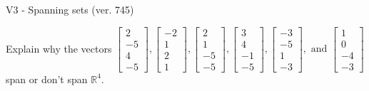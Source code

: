 \begin{exercise}
  \begin{exerciseTitle}V3 - Spanning sets (ver. 745)\end{exerciseTitle}
  \begin{exerciseStatement}
    Explain why the vectors \(\left[\begin{array}{r}
2 \\
-5 \\
4 \\
-5
\end{array}\right] , \left[\begin{array}{r}
-2 \\
1 \\
2 \\
1
\end{array}\right] , \left[\begin{array}{r}
2 \\
1 \\
-5 \\
-5
\end{array}\right] , \left[\begin{array}{r}
3 \\
4 \\
-1 \\
-5
\end{array}\right] , \left[\begin{array}{r}
-3 \\
-5 \\
1 \\
-3
\end{array}\right] , \text{ and } \left[\begin{array}{r}
1 \\
0 \\
-4 \\
-3
\end{array}\right]\) span or don't span \(\mathbb{R}^4\). 
	



\end{exerciseStatement}
\end{exercise}
